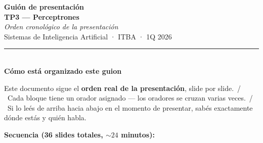 \documentclass[11pt,a4paper]{article}
\newcommand{\pausa}{\textcolor{muted}{\,/\,}}
\begin{document}
\begin{titlepage}
\thispagestyle{empty}
\vspace*{2cm}
\begin{flushleft}
{\fontsize{36}{42}\selectfont\bfseries\color{ink}Guión de presentación}\\[0.4em]
{\fontsize{22}{26}\selectfont\bfseries\color{accent}TP3 — Perceptrones}\\[0.4em]
{\large\color{muted}\textsl{Orden cronológico de la presentación}}\\[1em]
{\large\color{muted}Sistemas de Inteligencia Artificial · ITBA · 1Q 2026}\\[2em]

\rule{\linewidth}{0.4pt}\\[0.6em]

\textbf{Cómo está organizado este guion}\\[0.4em]

\begin{tip}
Este documento sigue el \textbf{orden real de la presentación}, slide por slide. \pausa\ Cada bloque tiene un orador asignado --- los oradores se cruzan varias veces. \pausa\ Si lo leés de arriba hacia abajo en el momento de presentar, sabés exactamente dónde estás y quién habla.
\end{tip}

\medskip
\textbf{Secuencia (36 slides totales, $\sim 24$ minutos):}


\end{flushleft}
\end{titlepage}
\end{document}
